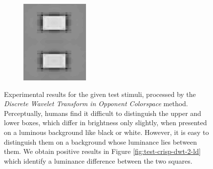 \documentclass[journal,onecolumn]{IEEEtran}
\begin{document}
{\begin{figure}[H]
\begin{subfigure}[b]{0.2\textwidth}
            \caption{}
            \label{fig:test-crisp-dwt-2-by}
    \end{subfigure}%
    \begin{subfigure}[b]{0.2\textwidth}
            \centering
            \includegraphics[width=.85\linewidth, frame]{test-crisp-dwt-3-by}
            \caption{}
            \label{fig:test-crisp-dwt-3-by}
    \end{subfigure}
    \caption{Experimental results for the given test stimuli, processed by the \textit{Discrete Wavelet Transform in Opponent Colorspace} method. Perceptually, humans find it difficult to distinguish the upper and lower boxes, which differ in brightness only slightly, when presented on a luminous background like black or white. However, it is easy to distinguish them on a background whose luminance lies between them. We obtain positive results in Figure \ref{fig:test-crisp-dwt-2-ld} which identify a luminance difference between the two squares.}
\end{figure}
\clearpage
}

%
%
%
\end{document}
